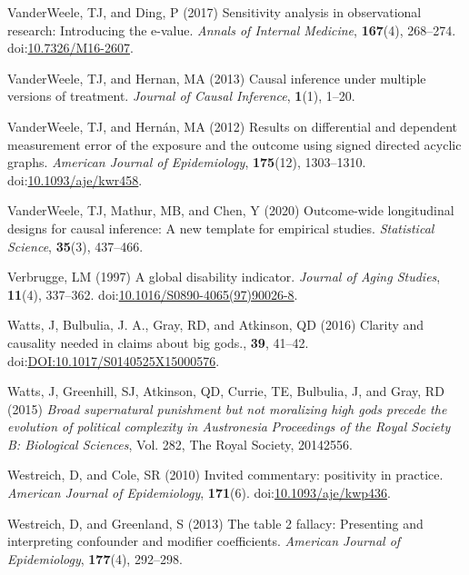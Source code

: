 \documentclass[
  single column]{article}
\newlength{\cslhangindent}
\newenvironment{CSLReferences}[2] %
 {\begin{list}{}{%
  \setlength{\itemindent}{0pt}
  \setlength{\leftmargin}{0pt}
  \setlength{\parsep}{0pt}
  \ifodd #1
   \setlength{\leftmargin}{\cslhangindent}
   \setlength{\itemindent}{-1\cslhangindent}
  \fi
  \setlength{\itemsep}{#2\baselineskip}}}
 {\end{list}}
\begin{document}
\begin{CSLReferences}{1}{0}
VanderWeele, TJ, and Ding, P (2017) Sensitivity analysis in
observational research: Introducing the e-value. \emph{Annals of
Internal Medicine}, \textbf{167}(4), 268--274.
doi:\href{https://doi.org/10.7326/M16-2607}{10.7326/M16-2607}.

VanderWeele, TJ, and Hernan, MA (2013) Causal inference under multiple
versions of treatment. \emph{Journal of Causal Inference},
\textbf{1}(1), 1--20.

VanderWeele, TJ, and Hernán, MA (2012) Results on differential and
dependent measurement error of the exposure and the outcome using signed
directed acyclic graphs. \emph{American Journal of Epidemiology},
\textbf{175}(12), 1303--1310.
doi:\href{https://doi.org/10.1093/aje/kwr458}{10.1093/aje/kwr458}.

VanderWeele, TJ, Mathur, MB, and Chen, Y (2020) Outcome-wide
longitudinal designs for causal inference: A new template for empirical
studies. \emph{Statistical Science}, \textbf{35}(3), 437--466.

Verbrugge, LM (1997) A global disability indicator. \emph{Journal of
Aging Studies}, \textbf{11}(4), 337--362.
doi:\href{https://doi.org/10.1016/S0890-4065(97)90026-8}{10.1016/S0890-4065(97)90026-8}.

Watts, J, Bulbulia, J. A., Gray, RD, and Atkinson, QD (2016) Clarity and
causality needed in claims about big gods., \textbf{39}, 41--42.
doi:\href{https://doi.org/DOI:10.1017/S0140525X15000576}{DOI:10.1017/S0140525X15000576}.

Watts, J, Greenhill, SJ, Atkinson, QD, Currie, TE, Bulbulia, J, and
Gray, RD (2015) \emph{Broad supernatural punishment but not moralizing
high gods precede the evolution of political complexity in
{A}ustronesia} \emph{Proceedings of the Royal Society B: Biological
Sciences}, Vol. 282, The Royal Society, 20142556.

Westreich, D, and Cole, SR (2010) Invited commentary: positivity in
practice. \emph{American Journal of Epidemiology}, \textbf{171}(6).
doi:\href{https://doi.org/10.1093/aje/kwp436}{10.1093/aje/kwp436}.

Westreich, D, and Greenland, S (2013) The table 2 fallacy: Presenting
and interpreting confounder and modifier coefficients. \emph{American
Journal of Epidemiology}, \textbf{177}(4), 292--298.


\end{CSLReferences}
\end{document}
